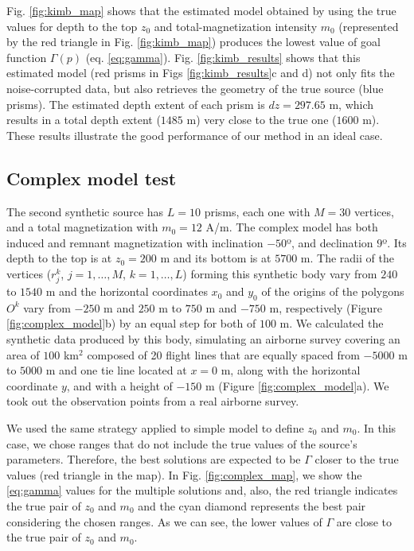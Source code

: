 Fig. \ref{fig:kimb_map} shows that the estimated model obtained by using the true values for depth to the top $ z_0 $ and total-magnetization intensity $ m_0 $ (represented by the red triangle in Fig. \ref{fig:kimb_map}) produces the lowest value of goal function  $ \Gamma(p) $ (eq. \ref{eq:gamma}). Fig. \ref{fig:kimb_results} shows that this estimated model (red prisms in Figs \ref{fig:kimb_results}c and d) not only fits the noise-corrupted data, but also retrieves the geometry of the true source (blue prisms). The estimated depth extent of each prism is $ dz = 297.65 $ m, which results in a total depth extent ($ 1485$ m) very close to the true one ($ 1600 $ m). These results illustrate the good performance of our method in an ideal case.

\subsection{Complex model test}

The second synthetic source has $L=10$ prisms, each one with $M=30$ vertices, and a total magnetization with $m_0 =12$ A/m. The complex model has both induced and remnant magnetization with inclination $-50$º, and declination $9$º. Its depth to the top is at $z_0=200$ m and its bottom is at $5700$ m. The radii of the vertices ($r_j^k$, $j=1,\dots,M$, $k=1,\dots,L$) forming this synthetic body vary from $240$ to $1540$ m and the horizontal coordinates $x_0$ and $y_0$ of the origins of the polygons $O^k$ vary from $-250$ m and $250$ m to $750$ m and $-750$ m, respectively (Figure \ref{fig:complex_model}b) by an equal step for both of $100$ m. We calculated the synthetic data produced by this body, simulating an airborne survey covering an area of $100$ km$^2$ composed of 20 flight lines that are equally spaced from $-5000$ m to $5000$ m and one tie line located at $x=0$ m, along with the horizontal coordinate $y$, and with a height of $-150$ m (Figure \ref{fig:complex_model}a). We took out the observation points from a real airborne survey.

We used the same strategy applied to simple model to define $z_0$ and $ m_0 $. In this case, we chose ranges that do not include the true values of the source's parameters. Therefore, the best solutions are expected to be $\Gamma$ closer to the true values (red triangle in the map). In Fig. \ref{fig:complex_map}, we show the \ref{eq:gamma} values for the multiple solutions and, also, the red triangle indicates the true pair of $z_0$ and $ m_0 $ and the cyan diamond represents the best pair considering the chosen ranges. As we can see, the lower values of $\Gamma$ are close to the true pair of $z_0$ and $ m_0 $.

